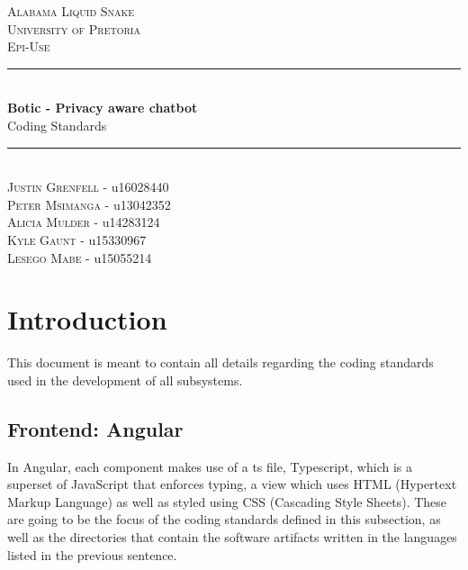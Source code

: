 \documentclass[11pt]{article}
\begin{document}
\renewcommand{\familydefault}{\sfdefault}
\begin{titlepage}
	\newcommand{\HRule}{\rule{\linewidth}{0.5mm}}
	\begin{center}
		            
		\textsc{\LARGE Alabama Liquid Snake}\\[0.8cm]
		\textsc{\Large University of Pretoria}\\[0.5cm]
		\textsc{\large Epi-Use}\\[0.5cm]
		    
		\HRule\\[0.4cm]
		    	
		{\huge\bfseries Botic - Privacy aware chatbot}\\[0.2cm]
		    	
		{\huge Coding Standards}\\[0.2cm]
		
		\HRule\\[0.5cm]
		
		\textsc{Justin Grenfell} - u16028440 \\[0cm]
		\textsc{Peter Msimanga} - u13042352 \\[0cm]
		\textsc{Alicia Mulder} - u14283124 \\[0cm]
		\textsc{Kyle Gaunt} - u15330967 \\[0cm]
		\textsc{Lesego Mabe} - u15055214 \\[0cm]
		    
	\end{center}
\end{titlepage}
\tableofcontents
\newpage
\section{Introduction}

This document is meant to contain all details regarding the coding standards used in the development of all subsystems.

\subsection{Frontend: Angular}

In Angular, each component makes use of a ts file, Typescript, which is a superset of JavaScript that enforces typing, a view which uses HTML (Hypertext Markup Language) as well as styled using CSS (Cascading Style Sheets). These are going to be the focus of the coding standards defined in this subsection, as well as the directories that contain the software artifacts written in the languages listed in the previous sentence.
\end{document}
